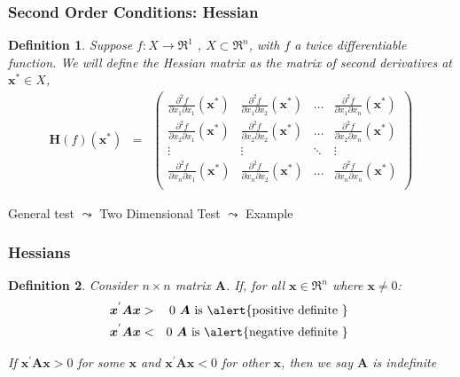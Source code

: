 \documentclass{beamer}
\newtheorem{defn}{Definition}
\numberwithin{equation}{section}
\begin{document}
\begin{frame}
\frametitle{Second Order Conditions: Hessian}


\begin{defn}
Suppose $f:X \rightarrow \Re^{1}$ , $X \subset \Re^{n}$, with $f$ a twice differentiable function.  We will define the \alert{Hessian} matrix as the matrix of second derivatives at $\boldsymbol{x}^{*} \in X$,
\begin{eqnarray}
\boldsymbol{H}(f)(\boldsymbol{x}^{*} )  & = & \begin{pmatrix} 
		\frac{\partial^{2} f }{\partial x_{1} \partial x_{1} } (\boldsymbol{x}^{*} ) & \frac{\partial^{2} f }{\partial x_{1} \partial x_{2} } (\boldsymbol{x}^{*} ) & \hdots & \frac{\partial^{2} f }{\partial x_{1} \partial x_{n} } (\boldsymbol{x}^{*} ) \\
		\frac{\partial^{2} f }{\partial x_{2} \partial x_{1} } (\boldsymbol{x}^{*} ) & \frac{\partial^{2} f }{\partial x_{2} \partial x_{2} } (\boldsymbol{x}^{*} ) & \hdots & \frac{\partial^{2} f }{\partial x_{2} \partial x_{n} } (\boldsymbol{x}^{*} ) \\
		\vdots & \vdots & \ddots & \vdots \\
		\frac{\partial^{2} f }{\partial x_{n} \partial x_{1} } (\boldsymbol{x}^{*} ) & \frac{\partial^{2} f }{\partial x_{n} \partial x_{2} } (\boldsymbol{x}^{*} ) & \hdots & \frac{\partial^{2} f }{\partial x_{n} \partial x_{n} } (\boldsymbol{x}^{*} ) \\
\end{pmatrix} \nonumber 
\end{eqnarray}

\end{defn}		
								
\alert{General test} $\leadsto$ Two Dimensional Test $\leadsto$ Example



\end{frame}


\begin{frame}
\frametitle{Hessians}
\begin{defn}
Consider $n \times n$ matrix $\boldsymbol{A}$.  If, for all $\boldsymbol{x} \in \Re^{n}$ where $\boldsymbol{x} \neq 0$:
\begin{eqnarray}
\boldsymbol{x}^{'} \boldsymbol{A} \boldsymbol{x} & > & 0 \text{ $\boldsymbol{A}$ is \alert{positive definite } } \nonumber \\
\boldsymbol{x}^{'} \boldsymbol{A} \boldsymbol{x} & < & 0 \text{ $\boldsymbol{A}$ is \alert{negative definite } } \nonumber 
\end{eqnarray}


If $\boldsymbol{x}^{'} \boldsymbol{A} \boldsymbol{x} >0$ for some $\boldsymbol{x}$ and $\boldsymbol{x}^{'} \boldsymbol{A} \boldsymbol{x}<0$ for other $\boldsymbol{x}$, then we say $\boldsymbol{A}$ is \alert{indefinite} 

\end{defn}


\end{frame}
\end{document}
